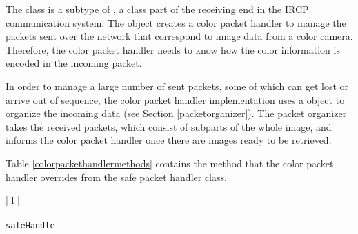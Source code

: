 The \ColorPacketHandler{} class is a subtype of \SafePacketHandler{}, a class part of the receiving end in 
the IRCP communication system. The \ColorReceiver{} object creates a color packet handler to manage the 
packets sent over the network that correspond to image data from a color camera. Therefore, the color
packet handler needs to know how the color information is encoded in the incoming packet. 

In order to manage a large number of sent packets, some of which can get lost or arrive out of sequence, 
the color packet handler implementation uses a \PacketOrganizer{} object to organize the incoming 
data (see Section \ref{packetorganizer}). The packet organizer takes the received packets, which 
consist of subparts of the whole image, and informs the color packet handler once there are images ready
to be retrieved.

Table \ref{colorpackethandlermethods} contains the method that the color packet handler overrides 
from the safe packet handler class. 

\begin{table}[ht]
\caption{Public methods in the \ColorPacketHandler{}  class}
\begin{center}
\begin{tabular}{| l |}
	\hline 
	 \\
	 \\
	\hline \hline
	\texttt{safeHandle} \\
	\hline
\end{tabular}
\end{center}
\label{colorpackethandlermethods}
\end{table}
